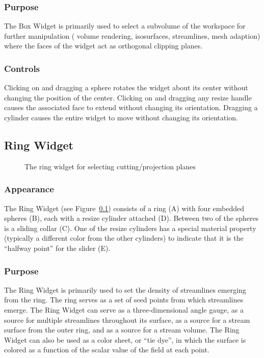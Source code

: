 \subsubsection{Purpose} The Box Widget is primarily used to select a
subvolume of the workspace for further manipulation (\eg{} volume
rendering, isosurfaces, streamlines, mesh adaption) where the faces of the
widget act as orthogonal clipping planes.

\subsubsection{Controls} Clicking on and dragging a sphere rotates
the widget about its center without changing the position of the center.
Clicking on and dragging any resize handle
causes the associated face to extend without changing its orientation.
Dragging a cylinder causes the entire widget to move without changing its
orientation.

\subsection{Ring Widget}
\label{sec:view-ringwidget} 

\begin{figure}[htb]
  \begin{makeimage}
  \end{makeimage}
  \ringwidget
  \caption{\label{fig:ringwidget} The ring widget for selecting
    cutting/projection planes}
\end{figure}


\subsubsection{Appearance} The Ring
Widget (see Figure~\ref{sec:view-ringwidget}) consists of a ring (A)
with four embedded spheres (B), each with a resize cylinder
attached (D).  Between two of the spheres is a sliding collar (C).
One of the resize cylinders has a special material property (typically
a different color from the other cylinders) to indicate that it is the
``halfway point'' for the slider (E).

\subsubsection{Purpose} The Ring Widget is primarily used to set the
density of streamlines emerging from the ring. The ring serves as a set of
seed points from which streamlines emerge. The Ring Widget can 
serve as a three-dimensional angle gauge, as a source for multiple
streamlines throughout its surface, as a source for a stream surface from
the outer ring, and as a source for a stream volume.  The Ring Widget can 
also be used as a color sheet, or ``tie dye'', in which the surface is colored as 
a function of the scalar value of the field at each point.

